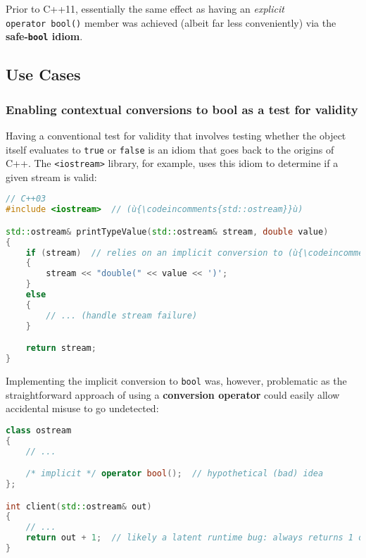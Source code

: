 \noindent Prior to C++11, essentially the same effect as having an \emph{explicit}
\texttt{operator}~\texttt{bool()} member was achieved (albeit far less
conveniently) via the \textbf{safe-\texttt{bool} idiom}.

\subsection[Use Cases]{Use Cases}\label{use-cases-explicitconv}

\subsubsection[Enabling contextual conversions to {\tt bool} as a test for validity]{Enabling contextual conversions to {\SubsubsecCode bool} as a test for validity}\label{enabling-contextual-conversions-to-bool-as-a-test-for-validity}

Having a conventional test for validity that involves testing whether the object itself evaluates to \texttt{true} or \texttt{false} is an idiom that goes back to the
origins of C++. The \texttt{<iostream>} library, for example, uses this
idiom to determine if a given stream is valid:

\begin{lstlisting}[language=C++]
// C++03
#include <iostream>  // (ù{\codeincomments{std::ostream}}ù)

std::ostream& printTypeValue(std::ostream& stream, double value)
{
    if (stream)  // relies on an implicit conversion to (ù{\codeincomments{bool}}ù)
    {
        stream << "double(" << value << ')';
    }
    else
    {
        // ... (handle stream failure)
    }

    return stream;
}
\end{lstlisting}

\noindent Implementing the implicit conversion to \texttt{bool} was, however,
problematic as the straight\-forward approach of using a
\textbf{conversion operator} could easily allow accidental misuse to go
undetected:

\begin{lstlisting}[language=C++]
class ostream
{
    // ...

    /* implicit */ operator bool();  // hypothetical (bad) idea
};

int client(std::ostream& out)
{
    // ...
    return out + 1;  // likely a latent runtime bug: always returns 1 or 2
}
\end{lstlisting}

